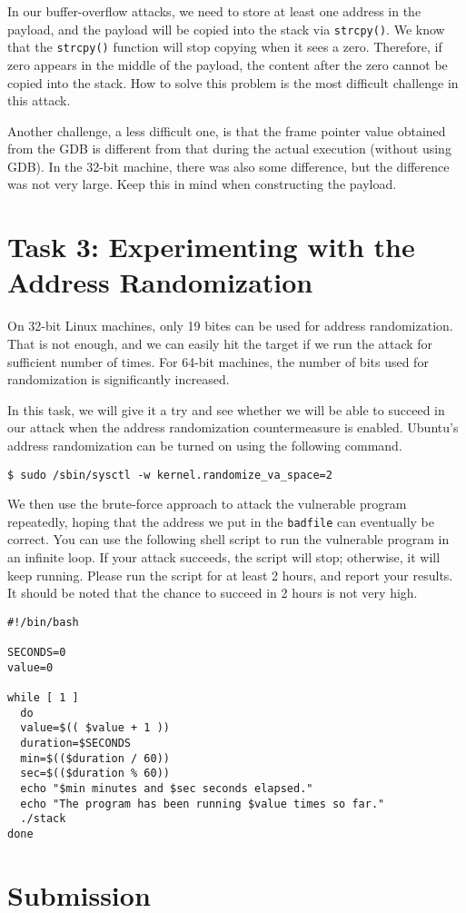 In our buffer-overflow attacks, we need to store at least one address 
in the payload, and the payload will be copied into the stack via
\texttt{strcpy()}. We know that the \texttt{strcpy()} function
will stop copying when it sees a zero. Therefore, if zero 
appears in the middle of the payload, the content after the 
zero cannot be copied into the stack. How to solve this 
problem is the most difficult challenge in this attack. 


Another challenge, a less difficult one, is that the frame pointer value 
obtained from the GDB is different from that during the actual
execution (without using GDB). In the 32-bit machine, there 
was also some difference, but the difference was not very large. 
Keep this in mind when constructing the payload. 


\section{Task 3: Experimenting with the Address Randomization}

On 32-bit Linux machines, only 19 bites can be used for address randomization.
That is not enough, and we can easily hit the target 
if we run the attack for sufficient number of times. For 64-bit 
machines, the number of bits used for randomization is 
significantly increased. 

In this task, we will give it a try and see whether we will be 
able to succeed in our attack when the address randomization countermeasure 
is enabled. 
Ubuntu's address randomization can be turned on 
using the following command.  


\begin{lstlisting}
$ sudo /sbin/sysctl -w kernel.randomize_va_space=2
\end{lstlisting}


We then use the brute-force approach to attack the vulnerable program repeatedly, hoping that 
the address we put in the \texttt{badfile} can eventually be correct. You can 
use the following shell script to run the vulnerable program in an infinite loop. If your
attack succeeds, the script will stop; otherwise, it will keep running. 
Please run the script for at least 2 hours, and report your results. It should be 
noted that the chance to succeed in 2 hours is not very high.  


\begin{lstlisting}
#!/bin/bash

SECONDS=0
value=0

while [ 1 ]
  do
  value=$(( $value + 1 ))
  duration=$SECONDS
  min=$(($duration / 60))
  sec=$(($duration % 60))
  echo "$min minutes and $sec seconds elapsed."
  echo "The program has been running $value times so far."
  ./stack
done
\end{lstlisting}



\section{Submission}




